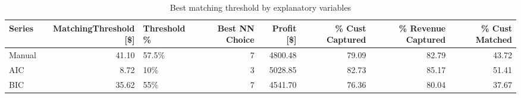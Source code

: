 \begin{table}[ht]
\centering
\caption{Best matching threshold by explanatory variables} 
\label{tab:series_max}
\begin{tabular}{lrlrrrrr}
  \hline
Series & MatchingThreshold [\$] & Threshold \% & Best NN Choice & Profit [\$] & \% Cust Captured & \% Revenue Captured & \% Cust Matched \\ 
  \hline
Manual & 41.10 & 57.5\% &   7 & 4800.48 & 79.09 & 82.79 & 43.72 \\ 
  AIC & 8.72 & 10\% &   3 & 5028.85 & 82.73 & 85.17 & 51.41 \\ 
  BIC & 35.62 & 55\% &   7 & 4541.70 & 76.36 & 80.04 & 37.67 \\ 
   \hline
\end{tabular}
\end{table}
